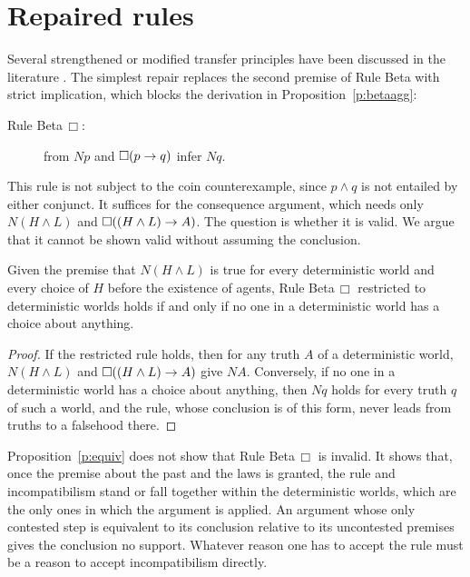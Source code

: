 \documentclass{situationist-preprint}
\begin{document}
\section{Repaired rules}

Several strengthened or modified transfer principles have been discussed in the literature \citep{Widerker1987, Huemer2000}. The simplest repair replaces the second premise of Rule Beta with strict implication, which blocks the derivation in Proposition~\ref{p:betaagg}:
\begin{description}
\item[Rule Beta$\,\Box$:] from $Np$ and $\mathord{\Box}(p \to q)$ infer $Nq$.
\end{description}
This rule is not subject to the coin counterexample, since $p \wedge q$ is not entailed by either conjunct. It suffices for the consequence argument, which needs only $N(H \wedge L)$ and $\mathord{\Box}((H \wedge L) \to A)$. The question is whether it is valid. We argue that it cannot be shown valid without assuming the conclusion.

\begin{proposition}\label{p:equiv}
Given the premise that $N(H \wedge L)$ is true for every deterministic world and every choice of $H$ before the existence of agents, Rule Beta$\,\Box$ restricted to deterministic worlds holds if and only if no one in a deterministic world has a choice about anything.
\end{proposition}

\begin{proof}
If the restricted rule holds, then for any truth $A$ of a deterministic world, $N(H \wedge L)$ and $\mathord{\Box}((H \wedge L) \to A)$ give $NA$. Conversely, if no one in a deterministic world has a choice about anything, then $Nq$ holds for every truth $q$ of such a world, and the rule, whose conclusion is of this form, never leads from truths to a falsehood there.
\end{proof}

Proposition~\ref{p:equiv} does not show that Rule Beta$\,\Box$ is invalid. It shows that, once the premise about the past and the laws is granted, the rule and incompatibilism stand or fall together within the deterministic worlds, which are the only ones in which the argument is applied. An argument whose only contested step is equivalent to its conclusion relative to its uncontested premises gives the conclusion no support. Whatever reason one has to accept the rule must be a reason to accept incompatibilism directly.
\end{document}
